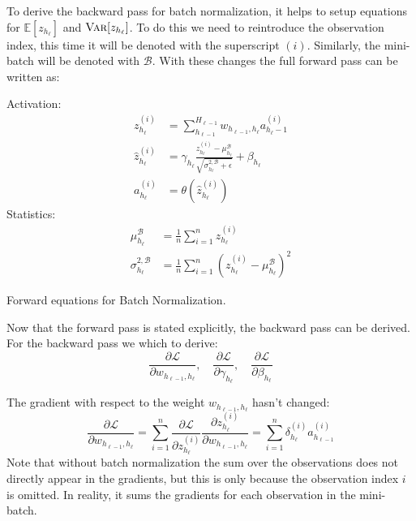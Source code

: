 To derive the backward pass for batch normalization, it helps to setup equations for $\mathbb{E}[z_{h_\ell}]$ and $\textsc{Var}[z_{h_\ell}]$. To do this we need to reintroduce the observation index, this time it will be denoted with the superscript $(i)$. Similarly, the mini-batch will be denoted with $\mathcal{B}$. With these changes the full forward pass can be written as:
\begin{equationbox}[H]
Activation:
\begin{equation*}
\begin{aligned}
z_{h_\ell}^{(i)} &= \sum_{h_{\ell-1}}^{H_{\ell-1}} w_{h_{\ell-1},h_\ell} a_{h_\ell-1}^{(i)} \\
\hat{z}_{h_\ell}^{(i)} &= \gamma_{h_\ell} \frac{z_{h_\ell}^{(i)} - \mu_{h_\ell}^{\mathcal{B}}}{\sqrt{\sigma_{h_\ell}^{2,\mathcal{B}} + \epsilon}} + \beta_{h_\ell} \\
a_{h_\ell}^{(i)} &= \theta\left(\hat{z}_{h_\ell}^{(i)}\right)
\end{aligned}
\end{equation*}
Statistics:
\begin{equation*}
\begin{aligned}
\mu_{h_\ell}^{\mathcal{B}} &= \frac{1}{n} \sum_{i=1}^n z_{h_\ell}^{(i)} \\
\sigma_{h_\ell}^{2, \mathcal{B}} &= \frac{1}{n} \sum_{i=1}^n (z_{h_\ell}^{(i)} - \mu_{h_\ell}^{\mathcal{B}})^2
\end{aligned}
\end{equation*}
\caption{Forward equations for Batch Normalization.}
\end{equationbox}

Now that the forward pass is stated explicitly, the backward pass can be derived. For the backward pass we which to derive:
\begin{equation}
\frac{\partial \mathcal{L}}{\partial w_{h_{\ell-1},h_\ell}},\quad \frac{\partial \mathcal{L}}{\partial \gamma_{h_\ell}},\quad \frac{\partial \mathcal{L}}{\partial \beta_{h_\ell}}
\end{equation}

The gradient with respect to the weight $w_{h_{\ell-1},h_\ell}$ hasn't changed:
\begin{equation}
\frac{\partial \mathcal{L}}{\partial w_{h_{\ell-1},h_\ell}} = \sum_{i=1}^n \frac{\partial \mathcal{L}}{\partial z_{h_\ell}^{(i)}} \frac{\partial z_{h_\ell}^{(i)}}{\partial w_{h_{\ell-1},h_\ell}} =\sum_{i=1}^n \delta_{h_\ell}^{(i)} a_{h_{\ell-1}}^{(i)}
\end{equation}
Note that without batch normalization the sum over the observations does not directly appear in the gradients, but this is only because the observation index $i$ is omitted. In reality, it sums the gradients for each observation in the mini-batch.

